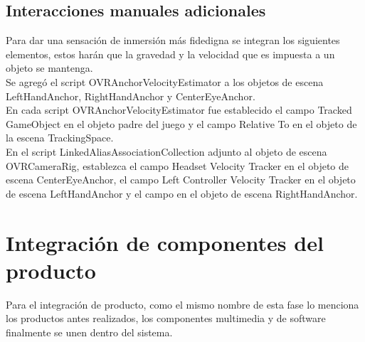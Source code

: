 \subsection{Interacciones manuales adicionales}

Para dar una sensación de inmersión más fidedigna se integran los siguientes elementos, estos harán que la gravedad y la velocidad que es impuesta a un objeto se mantenga.\\
Se agregó el script OVRAnchorVelocityEstimator a los objetos de escena LeftHandAnchor, RightHandAnchor y CenterEyeAnchor.\\
En cada script OVRAnchorVelocityEstimator fue establecido el campo Tracked GameObject en el objeto padre del juego y el campo Relative To en el objeto de la escena TrackingSpace.\\
En el script LinkedAliasAssociationCollection adjunto al objeto de escena OVRCameraRig, establezca el campo Headset Velocity Tracker en el objeto de escena CenterEyeAnchor, 
el campo Left Controller Velocity Tracker en el objeto de escena LeftHandAnchor y el campo en el objeto de escena RightHandAnchor.\\

\section{Integración de componentes del producto}
Para el integración de producto, como el mismo nombre de esta fase lo menciona los productos antes realizados, los componentes multimedia y de software finalmente se unen 
dentro del sistema.\\
